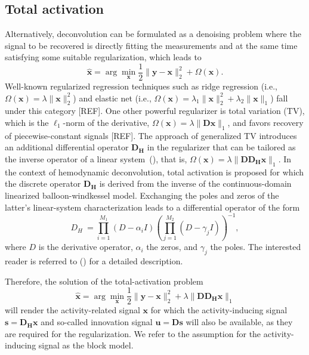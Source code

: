 
\subsection{Total activation}
Alternatively,  deconvolution can be formulated as a denoising problem where the signal to be recovered is directly fitting the measurements and at the same time satisfying some suitable regularization, which leads to
\begin{equation}
    \hat{\mathbf{x}} = \arg \min_{\mathbf{x}} \frac{1}{2} \| \mathbf{y} - \mathbf{x} \|_2^2 + \Omega(\mathbf{x}).
\end{equation}
Well-known regularized regression techniques such as ridge regression (i.e., $\Omega(\mathbf{x})=\lambda\|\mathbf{x}\|_2^2$) and elastic net (i.e., $\Omega(\mathbf{x})=\lambda_1\|\mathbf{x}\|_2^2 + \lambda_2\|\mathbf{x}\|_1$) fall under this category [REF]. One other powerful regularizer is total variation (TV), which is the $\ell_1$-norm of the derivative, $\Omega(\mathbf{x})=\lambda \|\mathbf{Dx}\|_1$, and favors recovery of piecewise-constant signals [REF]. The approach of generalized TV introduces an additional differential operator $\mathbf{D_H}$ in the regularizer that can be tailored as the inverse operator of a linear system~(\citealt{karahanoglu2011SignalProcessingApproacha}), that is, $\Omega(\mathbf{x})=\lambda \|\mathbf{D D_H x}\|_1$. In the context of hemodynamic deconvolution, total activation is proposed for which the discrete operator $\mathbf{D_H}$ is derived from the inverse of the continuous-domain linearized balloon-windkessel model. Exchanging the poles and zeros of the latter's linear-system characterization leads to a differential operator of the form 
\begin{equation}
    D_H\ = \prod_{i=1}^{M_1} (D-\alpha_i I) (\prod_{j=1}^{M_2} (D - \gamma_j I))^{-1},
\end{equation}
where \(D\) is the derivative operator, \(\alpha_i\) the zeros, and \(\gamma_j\) the poles. The interested reader is referred to (\citealt{karahanoglu2013TotalActivationFMRI}) for a detailed description. 

Therefore, the solution of the total-activation problem 
\begin{equation}
    \hat{\mathbf{x}} = \arg \min_{\mathbf{x}} \frac{1}{2} \| \mathbf{y} - \mathbf{x} \|_2^2 + \lambda \| \mathbf{D D_H x} \|_1
\end{equation}
will render the activity-related signal $\mathbf{x}$ for which the activity-inducing signal $\mathbf{s}=\mathbf{D_H x}$ and so-called innovation signal $\mathbf{u}=\mathbf{Ds}$ will also be available, as they are required for the regularization. We refer to the assumption for the activity-inducing signal as the block model.

